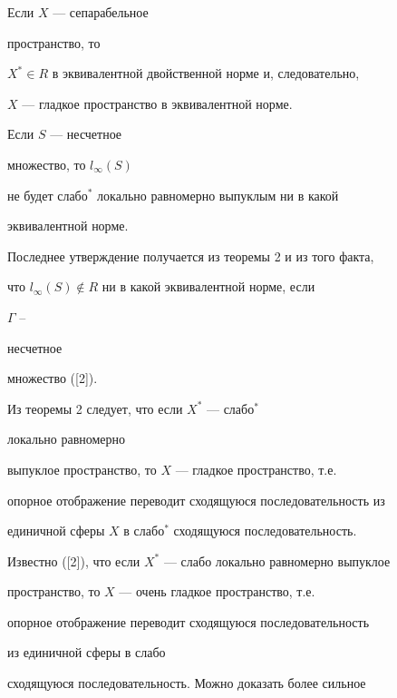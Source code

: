  


\begin{cor}[{\myfont{}[2]}] Если $X$ --- сепарабельное 


пространство, то 


$X^*\in R$ в эквивалентной двойственной норме и, следовательно, 


$X$ --- гладкое пространство в эквивалентной норме. 


\end{cor} 


 


\begin{cor}[{\myfont{}[1]}] Если $S$ --- несчетное 


множество, то $l_\infty (S)$


не будет слабо${}^*$ локально равномерно выпуклым ни в какой 


эквивалентной норме. 


\end{cor} 


 


Последнее утверждение получается из теоремы 2 и из того факта, 


что $l_\infty(S)\notin R$ ни в какой эквивалентной норме, если 


$\Gamma$ -- 


несчетное 


множество ([2]). 


 


Из теоремы 2 следует, что если $X^*$ --- слабо${}^*$ 


локально равномерно 


выпуклое пространство, то $X$ --- гладкое пространство, т.е. 


опорное отображение переводит сходящуюся последовательность из 


единичной сферы $X$ в слабо${}^*$ сходящуюся последовательность.  


Известно ([2]), что если $X^*$ --- слабо локально равномерно выпуклое 


пространство, то $X$ --- очень гладкое пространство, т.е. 


опорное отображение переводит сходящуюся последовательность 


из единичной сферы в слабо 


сходящуюся последовательность. Можно доказать более сильное  


